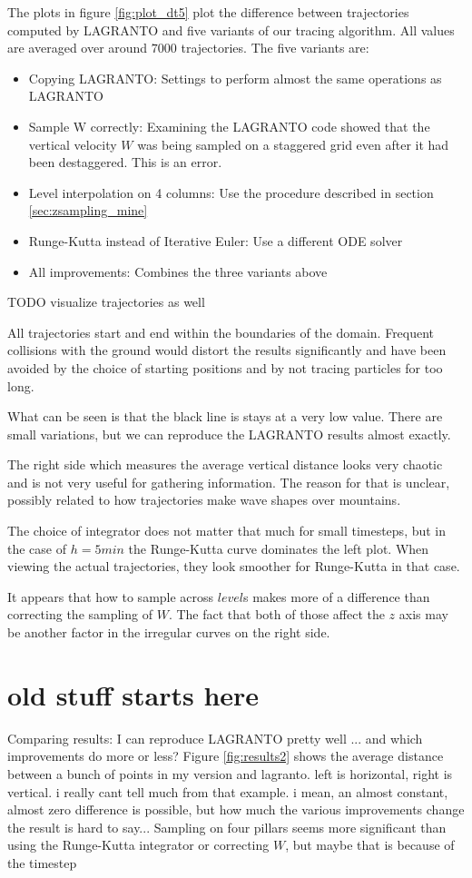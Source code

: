 The plots in figure \ref{fig:plot_dt5} plot the difference between trajectories computed by LAGRANTO and five variants of our tracing algorithm. All values are averaged over around $7000$ trajectories. The five variants are:
\begin{itemize}
\item Copying LAGRANTO: Settings to perform almost the same operations as LAGRANTO
\item Sample W correctly: Examining the LAGRANTO code showed that the vertical velocity $W$ was being sampled on a staggered grid even after it had been destaggered. This is an error.
\item Level interpolation on 4 columns: Use the procedure described in section \ref{sec:zsampling_mine}
\item Runge-Kutta instead of Iterative Euler: Use a different ODE solver
\item All improvements: Combines the three variants above
\end{itemize}
TODO visualize trajectories as well

All trajectories start and end within the boundaries of the domain. Frequent collisions with the ground would distort the results significantly and have been avoided by the choice of starting positions and by not tracing particles for too long.

What can be seen is that the black line is stays at a very low value. There are small variations, but we can reproduce the LAGRANTO results almost exactly.

The right side which measures the average vertical distance looks very chaotic and is not very useful for gathering information. The reason for that is unclear, possibly related to how trajectories make wave shapes over mountains.

The choice of integrator does not matter that much for small timesteps, but in the case of $h=5min$ the Runge-Kutta curve dominates the left plot. When viewing the actual trajectories, they look smoother for Runge-Kutta in that case.%

It appears that how to sample across $level$s makes more of a difference than correcting the sampling of $W$. The fact that both of those affect the $z$ axis may be another factor in the irregular curves on the right side.

\section{old stuff starts here}
Comparing results: I can reproduce LAGRANTO pretty well ... and which improvements do more or less?
Figure \ref{fig:results2} shows the average distance between a bunch of points in my version and lagranto. left is horizontal, right is vertical. i really cant tell much from that example. i mean, an almost constant, almost zero difference is possible, but how much the various improvements change the result is hard to say... Sampling on four pillars seems more significant than using the Runge-Kutta integrator or correcting $W$, but maybe that is because of the timestep

